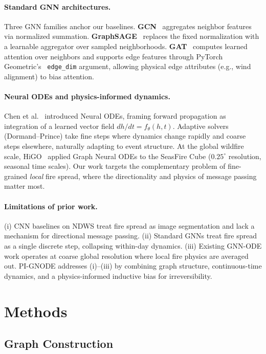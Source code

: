 \documentclass{article}
\begin{document}
\paragraph{Standard GNN architectures.} Three GNN families anchor our
baselines. \textbf{GCN}~\cite{kipf2017gcn} aggregates neighbor features via
normalized summation. \textbf{GraphSAGE}~\cite{hamilton2017sage} replaces the
fixed normalization with a learnable aggregator over sampled neighborhoods.
\textbf{GAT}~\cite{velickovic2018gat} computes learned attention over
neighbors and supports edge features through PyTorch
Geometric's~\cite{fey2019pyg} \texttt{edge\_dim} argument, allowing physical
edge attributes (e.g., wind alignment) to bias attention.

\paragraph{Neural ODEs and physics-informed dynamics.} Chen et
al.~\cite{chen2018neuralode} introduced Neural ODEs, framing forward
propagation as integration of a learned vector field $dh/dt = f_\theta(h, t)$.
Adaptive solvers (Dormand--Prince) take fine steps where dynamics change
rapidly and coarse steps elsewhere, naturally adapting to event structure.
At the global wildfire scale, HiGO~\cite{higo2026} applied Graph Neural ODEs
to the SeasFire Cube ($0.25^\circ$ resolution, seasonal time scales). Our
work targets the complementary problem of fine-grained \emph{local} fire
spread, where the directionality and physics of message passing matter most.

\paragraph{Limitations of prior work.} (i) CNN baselines on NDWS treat fire
spread as image segmentation and lack a mechanism for directional message
passing. (ii) Standard GNNs treat fire spread as a single discrete step,
collapsing within-day dynamics. (iii) Existing GNN-ODE work operates at
coarse global resolution where local fire physics are averaged out. PI-GNODE
addresses (i)--(iii) by combining graph structure, continuous-time dynamics,
and a physics-informed inductive bias for irreversibility.

\section{Methods}\label{sec:methods}

\subsection{Graph Construction}
\end{document}
